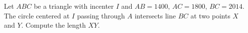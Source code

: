 Let $ABC$ be a triangle with incenter $I$ and $AB = 1400$, $AC = 1800$, $BC = 2014$.  The circle centered at $I$ passing through $A$ intersects line $BC$ at two points $X$ and $Y$. Compute the length $XY$.
